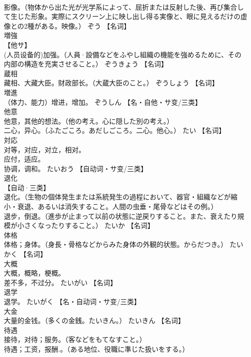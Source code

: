 \documentclass[8pt]{extreport}
\begin{document}
\begin{CJK}{UTF8}{min}
\\	影像。（物体から出た光が光学系によって、屈折または反射した後、再び集合して生じた形象。実際にスクリーン上に映し出し得る実像と、眼に見えるだけの虚像との2種がある。映像。）	ぞう		【名词】
\\	増強	
\\	【他サ】 
\\	(人员设备的)加强。（人員·設備などをふやし組織の機能を強めるために、その内部の構造を充実させること。）	ぞうきょう		【名词】
\\	蔵相	
\\	藏相、大藏大臣。财政部长。（大蔵大臣のこと。）	ぞうしょう		【名词】
\\	増進	
\\	（体力、能力）增进，增加。	ぞうしん		【名・自他・サ变/三类】
\\	他意	
\\	他意，其他的想法。（他の考え。心に隠した別の考え。） 
\\	二心，异心。（ふたごころ。あだしごころ。二心。他心。）	たい		【名词】
\\	対応	
\\	对等，对应，对立，相对。 
\\	应付，适应。 
\\	协调，调和。	たいおう		【自动词・サ变/三类】
\\	退化	
\\	【自动·三类】 
\\	退化。（生物の個体発生または系統発生の過程において、器官・組織などが縮小・衰退、あるいは消失すること。人間の虫垂・尾骨などはその例。） 
\\	退步，倒退。（進歩が止まって以前の状態に逆戻りすること。また、衰えたり規模が小さくなったりすること。）	たいか		【名词】
\\	体格	
\\	体格；身体。（身長・骨格などからみた身体の外観的状態。からだつき。）	たいかく		【名词】
\\	大概	
\\	大概，概略，梗概。 
\\	差不多，不过分。	たいがい		【名词】
\\	退学	
\\	退学。	たいがく		【名・自动词・サ变/三类】
\\	大金	
\\	大量的金钱。（多くの金銭。たいきん。）	たいきん		【名词】
\\	待遇	
\\	接待，对待；服务。（客などをもてなすこと。） 
\\	待遇；工资，报酬.。（ある地位、役職に準じた扱いをする。） 

\end{CJK}
\end{document}
